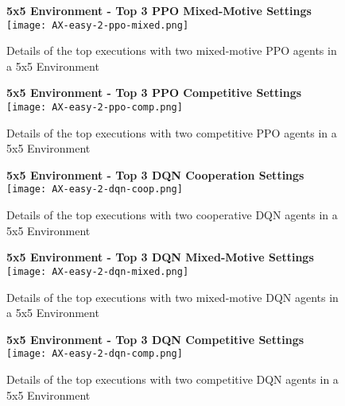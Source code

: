 \newpage
\vfill
\begin{figure}
    \centering
    \textbf{5x5 Environment - Top 3 PPO Mixed-Motive Settings}
    \texttt{[image: AX-easy-2-ppo-mixed.png]}\\
    \caption[Details of Top PPO Mixed-Motive Executions in a 5x5 Environment]{Details of the top executions with two mixed-motive PPO agents in a 5x5 Environment}\label{fig:ax-easy-2-ppo-mixed}
\end{figure}
\vfill
\clearpage

\newpage
\vfill
\begin{figure}
    \centering
    \textbf{5x5 Environment - Top 3 PPO Competitive Settings}
    \texttt{[image: AX-easy-2-ppo-comp.png]}\\
    \caption[Details of Top PPO Competitive Executions in a 5x5 Environment]{Details of the top executions with two competitive PPO agents in a 5x5 Environment}\label{fig:ax-easy-2-ppo-comp}
\end{figure}
\vfill
\clearpage

\newpage
\vfill
\begin{figure}
    \centering
    \textbf{5x5 Environment - Top 3 DQN Cooperation Settings}
    \texttt{[image: AX-easy-2-dqn-coop.png]}\\
    \caption[Details of Top DQN Cooperation Executions in a 5x5 Environment]{Details of the top executions with two cooperative DQN agents in a 5x5 Environment}\label{fig:ax-easy-2-dqn-coop}
\end{figure}
\vfill
\clearpage


\newpage
\vfill
\begin{figure}
    \centering
    \textbf{5x5 Environment - Top 3 DQN Mixed-Motive Settings}
    \texttt{[image: AX-easy-2-dqn-mixed.png]}\\
    \caption[Details of Top DQN Mixed-Motive Executions in a 5x5 Environment]{Details of the top executions with two mixed-motive DQN agents in a 5x5 Environment}\label{fig:ax-easy-2-dqn-mixed}
\end{figure}
\vfill
\clearpage

\newpage
\vfill
\begin{figure}
    \centering
    \textbf{5x5 Environment - Top 3 DQN Competitive Settings}
    \texttt{[image: AX-easy-2-dqn-comp.png]}\\
    \caption[Details of Top DQN Competitive Executions in a 5x5 Environment]{Details of the top executions with two competitive DQN agents in a 5x5 Environment}\label{fig:ax-easy-2-dqn-comp}
\end{figure}
\vfill
\clearpage

